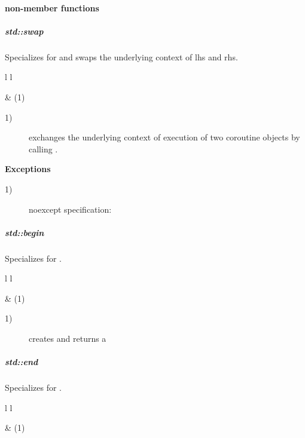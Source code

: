 \paragraph*{non-member functions}
\subparagraph*{std::swap}
Specializes  for \pushcoro and swaps the underlying context of
lhs and rhs.\\

\begin{tabular}{ l l }
    \midrule

     & (1)\\

    \midrule
\end{tabular}

\begin{description}
    \item[1)] exchanges the underlying context of execution of two coroutine
              objects by calling .\\
\end{description}

{\bf Exceptions}
\begin{description}
    \item[1)] noexcept specification: \\
\end{description}

\subparagraph*{std::begin}
Specializes  for \pushcoro.\\

\begin{tabular}{ l l }
    \midrule

     & (1)\\

    \midrule
\end{tabular}

\begin{description}
    \item[1)] creates and returns a \\
\end{description}

\subparagraph*{std::end}
Specializes  for \pushcoro.\\

\begin{tabular}{ l l }
    \midrule

     & (1)\\

    \midrule
\end{tabular}


